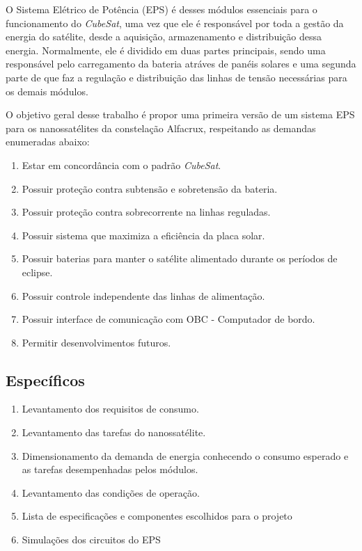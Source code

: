 O Sistema Elétrico de Potência (EPS) é desses módulos essenciais para o funcionamento do \textit{CubeSat}, uma vez que ele é responsável por toda a gestão da energia do satélite, desde a aquisição, armazenamento e distribuição dessa energia. Normalmente, ele é dividido em duas partes principais, sendo uma responsável pelo carregamento da bateria atráves de panéis solares e uma segunda parte de que faz a regulação e distribuição das linhas de tensão necessárias para os demais módulos. 

O objetivo geral desse trabalho é propor uma primeira versão de um sistema EPS para os nanossatélites da constelação Alfacrux, respeitando as demandas enumeradas abaixo:

\begin{enumerate}
    \item Estar em concordância com o padrão \textit{CubeSat}.
    \item Possuir proteção contra subtensão e sobretensão da bateria.
    \item Possuir proteção contra sobrecorrente na linhas reguladas.
    \item Possuir sistema que maximiza a eficiência da placa solar.
    \item Possuir baterias para manter o satélite alimentado durante os períodos de eclipse.
    \item Possuir controle independente das linhas de alimentação.
    \item Possuir interface de comunicação com OBC - Computador de bordo.
    \item Permitir desenvolvimentos futuros.
\end{enumerate}{}


\subsection*{Específicos}\label{especificos}

\begin{enumerate}
    \item Levantamento dos requisitos de consumo.
    \item Levantamento das tarefas do nanossatélite.
    \item Dimensionamento da demanda de energia conhecendo o consumo esperado e as tarefas desempenhadas pelos módulos.
    \item Levantamento das condições de operação.
    \item Lista de especificações e componentes escolhidos para o projeto
    \item Simulações dos circuitos do EPS
\end{enumerate}